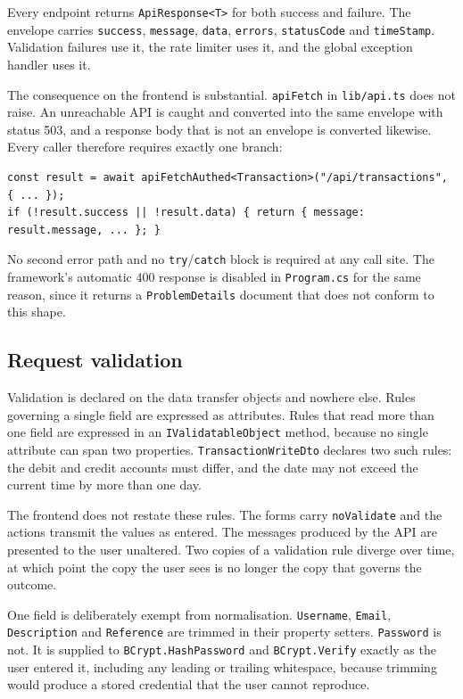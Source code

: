 \documentclass[11pt,a4paper]{article}
\newcommand{\code}[1]{\texttt{\fontsize{8.6}{10}\selectfont #1}}
\begin{document}
Every endpoint returns \code{ApiResponse<T>} for both success and failure. The
envelope carries \code{success}, \code{message}, \code{data}, \code{errors},
\code{statusCode} and \code{timeStamp}. Validation failures use it, the rate
limiter uses it, and the global exception handler uses it.

The consequence on the frontend is substantial. \code{apiFetch} in
\code{lib/api.ts} does not raise. An unreachable API is caught and converted
into the same envelope with status 503, and a response body that is not an
envelope is converted likewise. Every caller therefore requires exactly one
branch:

\begin{lstlisting}
const result = await apiFetchAuthed<Transaction>("/api/transactions", { ... });
if (!result.success || !result.data) { return { message: result.message, ... }; }
\end{lstlisting}

No second error path and no \code{try}/\code{catch} block is required at any
call site. The framework's automatic 400 response is disabled in
\code{Program.cs} for the same reason, since it returns a \code{ProblemDetails}
document that does not conform to this shape.

\subsection{Request validation}

Validation is declared on the data transfer objects and nowhere else. Rules
governing a single field are expressed as attributes. Rules that read more than
one field are expressed in an \code{IValidatableObject} method, because no
single attribute can span two properties. \code{TransactionWriteDto} declares
two such rules: the debit and credit accounts must differ, and the date may not
exceed the current time by more than one day.

The frontend does not restate these rules. The forms carry
\code{noValidate} and the actions transmit the values as entered. The messages
produced by the API are presented to the user unaltered. Two copies of a
validation rule diverge over time, at which point the copy the user sees is no
longer the copy that governs the outcome.

One field is deliberately exempt from normalisation. \code{Username},
\code{Email}, \code{Description} and \code{Reference} are trimmed in their
property setters. \code{Password} is not. It is supplied to
\code{BCrypt.HashPassword} and \code{BCrypt.Verify} exactly as the user entered
it, including any leading or trailing whitespace, because trimming would
produce a stored credential that the user cannot reproduce.
\end{document}
